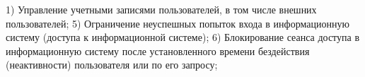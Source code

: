 1) Управление 
учетными записями пользователей, в том числе внешних пользователей;
5) Ограничение неуспешных попыток входа в информационную
систему (доступа к информационной системе);
6) Блокирование сеанса доступа в информационную систему после
установленного времени бездействия (неактивности) пользователя или по его
запросу;






